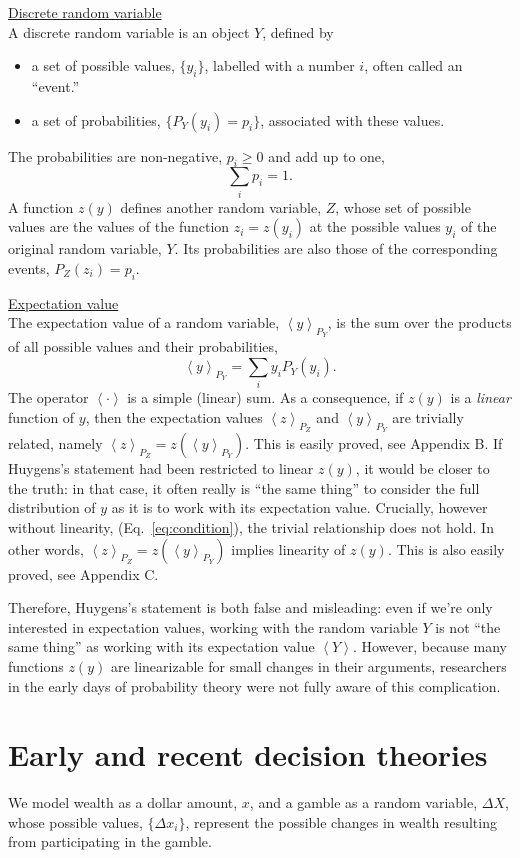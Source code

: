 \documentclass[final]{ectaart}
\newcommand{\ave}[1]{\left\langle#1 \right\rangle}
\newcommand{\bi}{\begin{itemize}}
\newcommand{\ei}{\end{itemize}}
\newcommand{\eref}[1]{(Eq.~\ref{eq:#1})}
\newcommand{\seclabel}[1]{\label{section:#1}}
\newcommand{\be}{\begin{equation}}
\newcommand{\ee}{\end{equation}}
\newcommand{\Dx}{{\Delta x}}
\newcommand{\DX}{{\Delta X}}
\theoremstyle{plain}
\begin{document}
\underline{Discrete random variable}\\
A discrete random variable is an object $Y$, defined by 
\bi
\item
a set of possible values, $\{y_i\}$, labelled with a number $i$, often called an ``event.'' 
\item
a set of probabilities, $\{P_Y(y_i)=p_i\}$, associated with these values.
\ei
The probabilities are non-negative, $p_i\geq0$ and add up to one,
\be
\sum_i p_i =1.
\ee
A function $z(y)$ defines another random variable, $Z$, whose set of possible values are the values of the function $z_i=z(y_i)$ at the possible values $y_i$ of the original random variable, $Y$. Its probabilities are also those of the corresponding events, $P_Z(z_i)=p_i$.

\underline{Expectation value}\\
The expectation value of a random variable, $\ave{y}_{P_Y}$, is the sum over the products of all possible values and their probabilities, 
\be
\ave{y}_{P_Y}=\sum_i y_i P_Y(y_i).
\ee
The operator $\ave{\cdot}$ is a simple (linear) sum. As a consequence, if $z(y)$ is a {\it linear} function of $y$, then the expectation values $\ave{z}_{P_Z}$ and
$\ave{y}_{P_Y}$ are trivially related, namely $\ave{z}_{P_Z}=z\left(\ave{y}_{P_Y}\right)$. 
This is easily proved, see Appendix B. If Huygens's statement had been restricted to linear $z(y)$, it would be closer to the truth: in that case, it often really is ``the same thing'' to consider the full distribution of $y$ as it is to work with its expectation value. 
Crucially, however without linearity, \eref{condition}, the trivial relationship does not hold. In other words, $\ave{z}_{P_Z}=z\left(\ave{y}_{P_Y}\right)$ implies linearity of $z(y)$. This is also easily proved, see Appendix C.

Therefore, Huygens's statement is both false and misleading: even if we're only interested in expectation values, working with the random variable $Y$ is not ``the same thing'' as working with its expectation value $\ave{Y}$. However, because many functions $z(y)$ are linearizable for small changes in their arguments, researchers in the early days of probability theory were not fully aware of this complication.

\section{Early and recent decision theories}
\seclabel{Early}
We model wealth as a dollar amount, $x$, and a gamble as a random variable, $\DX$, whose possible values, $\{\Dx_i\}$, represent the possible changes in wealth resulting from participating in the gamble. 
\end{document}
